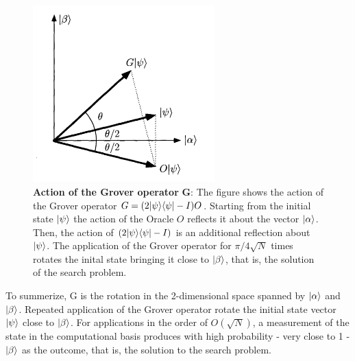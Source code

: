 \begin{figure}[ht]
  \centering
  \includegraphics[width=70mm]{figures/chapter1/grover_reflection}
  \caption[Action of the Grover operator]{\textbf{Action of the Grover operator }$\bm{G}$: The figure shows the action of the Grover operator $G=(2{|{\psi}\rangle}{\langle{\psi}|} -I)O$. Starting from the initial state ${|{\psi}\rangle}$ the action of the Oracle $O$ reflects it about the vector ${|{\alpha}\rangle}$. Then, the action of $(2{|{\psi}\rangle}{\langle{\psi}|}-I)$ is an additional reflection about ${|{\psi}\rangle}$. The application of the Grover operator for $\pi/4\sqrt{N}$ times rotates the inital state bringing it close to ${|{\beta}\rangle}$, that is, the solution of the search problem.}
  \label{fig:grover_operator}
\end{figure}


\noindent
To summerize, G is the rotation in the 2-dimensional space spanned by ${|{\alpha}\rangle}$ and ${|{\beta}\rangle}$. Repeated application of the Grover operator rotate the initial state vector ${|{\psi}\rangle}$ close to ${|{\beta}\rangle}$. For applications in the order of $O(\sqrt{N})$, a measurement of the state in the computational basis produces with high probability - very close to 1 - ${|{\beta}\rangle}$ as the outcome, that is, the solution to the search problem.


